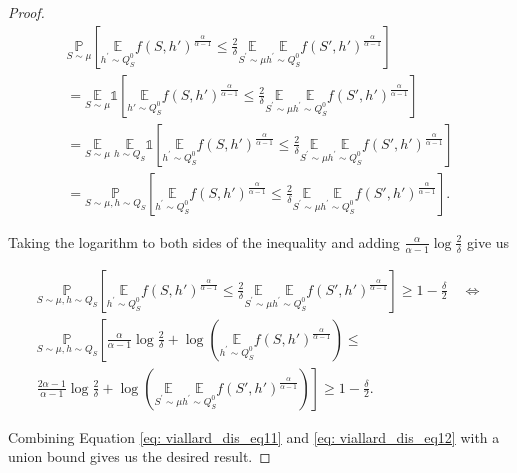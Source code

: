 \begin{proof}[Proof]
\begin{multline*}
\underset{S \sim \mu}{\mathbb{P}}\left[\underset{h^{\prime} \sim Q_S^0}{\mathbb{E}} f(S,h')^{\frac{\alpha}{\alpha-1}} \leq \frac{2}{\delta} \underset{S^{\prime} \sim \mu}{\mathbb{E}} \underset{h^{\prime} \sim Q_S^0}{\mathbb{E}} f(S',h')^{\frac{\alpha}{\alpha-1}}\right] \\
=\underset{S \sim \mu}{\mathbb{E}}\mathds{1}\left[\underset{h'\sim Q_S^0}{\mathbb{E}} f(S,h')^{\frac{\alpha}{\alpha-1}} \leq \frac{2}{\delta} \underset{S^{\prime} \sim \mu}{\mathbb{E}} \underset{h^{\prime} \sim Q_S^0}{\mathbb{E}} f(S',h')^{\frac{\alpha}{\alpha-1}}\right] \\
=\underset{S \sim \mu}{\mathbb{E}}\; \underset{h \sim Q_{S}}{\mathbb{E}} \mathds{1}\left[\underset{h^{\prime} \sim Q_S^0}{\mathbb{E}} f(S,h')^{\frac{\alpha}{\alpha-1}} \leq \frac{2}{\delta} \underset{S^{\prime} \sim \mu}{\mathbb{E}} \underset{h^{\prime} \sim Q_S^0}{\mathbb{E}} f(S',h')^{\frac{\alpha}{\alpha-1}}\right] \\
=\underset{S \sim \mu, h \sim Q_{S}}{\mathbb{P}}\left[\underset{h^{\prime} \sim Q_S^0}{\mathbb{E}} f(S,h')^{\frac{\alpha}{\alpha-1}} \leq \frac{2}{\delta} \underset{S^{\prime} \sim \mu}{\mathbb{E}} \underset{h^{\prime} \sim Q_S^0}{\mathbb{E}} f(S',h')^{\frac{\alpha}{\alpha-1}}\right] .
\end{multline*}

Taking the logarithm to both sides of the inequality and adding $\frac{\alpha}{\alpha-1} \log \frac{2}{\delta}$ give us

\begin{multline}
\underset{S \sim \mu, h \sim Q_{S}}{\mathbb{P}}\left[\underset{h^{\prime} \sim Q_S^0}{\mathbb{E}} f(S,h')^{\frac{\alpha}{\alpha-1}} \leq \frac{2}{\delta} \underset{S^{\prime} \sim \mu}{\mathbb{E}} \underset{h^{\prime} \sim Q_S^0}{\mathbb{E}} f(S',h')^{\frac{\alpha}{\alpha-1}}\right] \geq 1-\frac{\delta}{2} \quad \Longleftrightarrow \\
\label{eq: viallard_dis_eq12}
\underset{S \sim \mu, h \sim Q_{S}}{\mathbb{P}}\left[\frac{\alpha}{\alpha-1} \log \frac{2}{\delta}+\log \left(\underset{h^{\prime} \sim Q_S^0}{\mathbb{E}} f(S,h')^{\frac{\alpha}{\alpha-1}}\right) \leq \right. \\
 \left. \frac{2 \alpha-1}{\alpha-1} \log \frac{2}{\delta}+\log \left(\underset{S^{\prime} \sim \mu}{\mathbb{E}} \underset{h^{\prime} \sim Q_S^0}{\mathbb{E}} f(S',h')^{\frac{\alpha}{\alpha-1}}\right)\right] \geq 1-\frac{\delta}{2} .
\end{multline}

Combining Equation \cref{eq: viallard_dis_eq11} and \cref{eq: viallard_dis_eq12} with a union bound gives us the desired result.
\end{proof}











